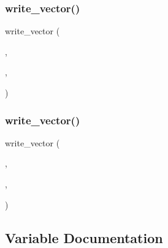 \subsubsection{\texorpdfstring{write\+\_\+vector()}{write\_vector()}\hspace{0.1cm}{\footnotesize\ttfamily [7/8]}}
{\footnotesize\ttfamily write\+\_\+vector (\begin{DoxyParamCaption}\item[{\hyperlink{a00473_ae0527cbfd56392d5095a691bbf10ba5b}{f\+ID}}]{,  }\item[{\hyperlink{a00473_af5555ce3d578203ae1f6d0731e4f1170}{sfq}}]{,  }\item[{\textquotesingle{}\hyperlink{a00473_af5555ce3d578203ae1f6d0731e4f1170}{sfq}\textquotesingle{}}]{ }\end{DoxyParamCaption})}

\mbox{\label{a00473_a440aca7095ed6ac602d8b22d073c8ea1}} 
\subsubsection{\texorpdfstring{write\+\_\+vector()}{write\_vector()}\hspace{0.1cm}{\footnotesize\ttfamily [8/8]}}
{\footnotesize\ttfamily write\+\_\+vector (\begin{DoxyParamCaption}\item[{\hyperlink{a00473_ae0527cbfd56392d5095a691bbf10ba5b}{f\+ID}}]{,  }\item[{\hyperlink{a00473_a7bb9d681a4df47c616b79d82759cd0e6}{wf}}]{,  }\item[{\textquotesingle{}\hyperlink{a00473_a7bb9d681a4df47c616b79d82759cd0e6}{wf}\textquotesingle{}}]{ }\end{DoxyParamCaption})}



\subsection{Variable Documentation}
\mbox{\label{a00473_a7d15a4f6e76dff66c5b4314123b32e0d}} 
